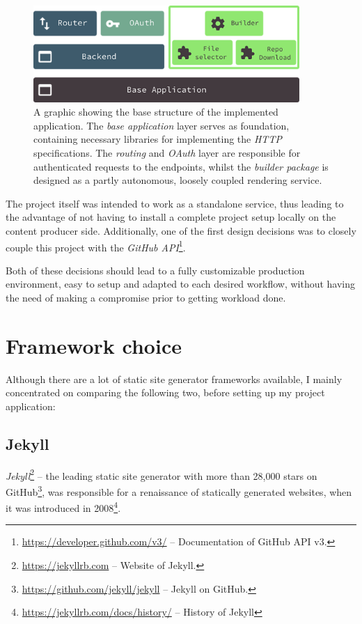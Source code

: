 \documentclass[a4paper,english,11pt]{report}
\begin{document}
%
\begin{figure}[t]
    \centering
    \includegraphics[width=0.9\textwidth]{application_structure.png}
    \caption{A graphic showing the base structure of the implemented application. The \emph{base application} layer serves as foundation, containing necessary libraries for implementing the \emph{HTTP} specifications. The \emph{routing} and \emph{OAuth} layer are responsible for authenticated requests to the endpoints, whilst the \emph{builder package} is designed as a partly autonomous, loosely coupled rendering service.}
    \label{fig:application_structure}
\end{figure}
%

The project itself was intended to work as a standalone service, thus leading to the advantage of not having to install a complete project setup locally on the content producer side. Additionally, one of the first design decisions was to closely couple this project with the \emph{GitHub API}\footnote{\url{https://developer.github.com/v3/} -- Documentation of GitHub API v3.}.

Both of these decisions should lead to a fully customizable production environment, easy to setup and adapted to each desired workflow, without having the need of making a compromise prior to getting workload done.

\section{Framework choice}
Although there are a lot of static site generator frameworks available, I mainly concentrated on comparing the following two, before setting up my project application:

\subsection{Jekyll}
\emph{Jekyll}\footnote{\url{https://jekyllrb.com} -- Website of Jekyll.} -- the leading static site generator with more than 28,000 stars on GitHub\footnote{\url{https://github.com/jekyll/jekyll} -- Jekyll on GitHub.}, was responsible for a renaissance of statically generated websites, when it was introduced in 2008\footnote{\url{https://jekyllrb.com/docs/history/} -- History of Jekyll}.
\end{document}

